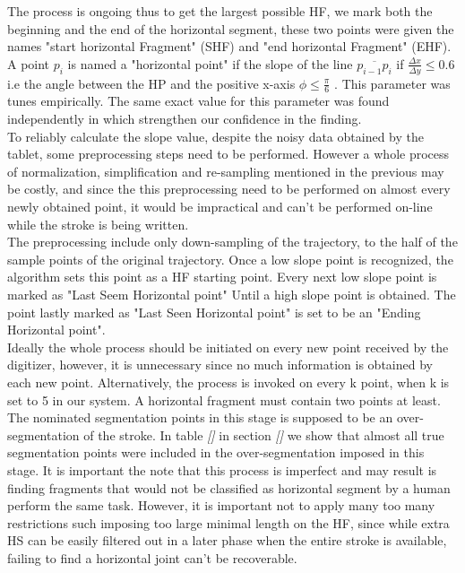 \documentclass[journal,compsoc]{IEEEtran}
\begin{document}
The process is ongoing thus to get the largest possible HF, we mark both the beginning and the end of the horizontal segment, these two points were given the names "start horizontal Fragment" (SHF) and "end horizontal Fragment" (EHF). 
A point $p_{i}$ is named a "horizontal point" if the slope of the line $\overline{p_{i-1}p_{i}}$ if $\frac{\Delta x}{\Delta y}\leq0.6$ i.e the angle between the HP and the positive x-axis $\phi \leq \frac{\pi}{6}$ . This parameter was tunes empirically. The same exact value for this parameter was found independently in \cite{daifallah2009recognition} which strengthen our confidence in the finding.\\
To reliably calculate the slope value, despite the noisy data obtained by the tablet, some preprocessing steps need to be performed. However a whole process of normalization, simplification and re-sampling mentioned in the previous may be costly, and since the this preprocessing need to be performed on almost every newly obtained point, it would be impractical and can't be performed on-line while the stroke is being written.\\

The preprocessing include only down-sampling of the trajectory, to the half of the sample points of the original trajectory.
Once a low slope point is recognized, the algorithm sets this point as a HF starting point. Every next low slope point is marked as "Last Seem Horizontal point" Until a high slope point is obtained. The point lastly marked as "Last Seen Horizontal point" is set to be an "Ending Horizontal point".\\

Ideally the whole process should be initiated on every new point received by the digitizer, however, it is unnecessary since no much information is obtained by each new point. Alternatively, the process is invoked on every k point, when k is set to 5 in our system. A horizontal fragment must contain two points at least.\\

The nominated segmentation points in this stage is supposed to be an over-segmentation of the stroke. In table \emph{[]} in section \emph{[]} we show that almost all true segmentation points were included in the over-segmentation imposed in this stage. 
It is important the note that this process is imperfect and may result is finding fragments that would not be classified as horizontal segment by a human perform the same task. However, it is important not to apply many too many restrictions such imposing too large minimal length on the HF, since while extra HS can be easily filtered out in a later phase when the entire stroke is available, failing to find a horizontal joint can't be recoverable.\\
\end{document}
